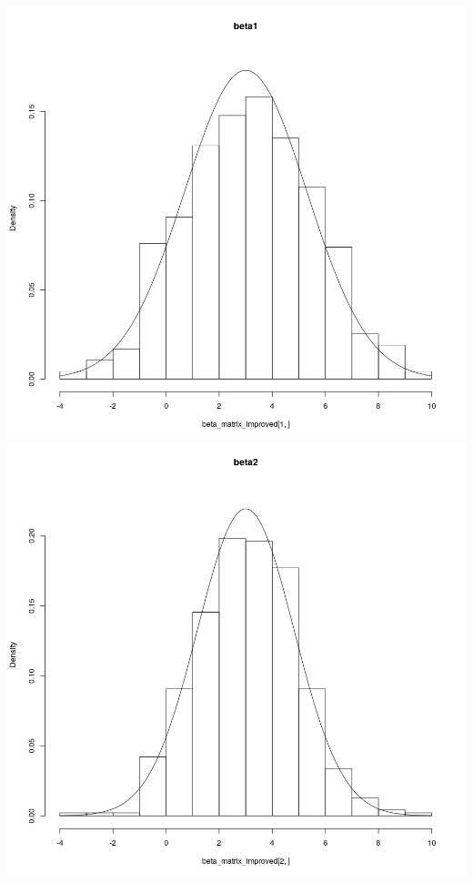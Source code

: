 \documentclass[a4paper,11pt]{article}
\begin{document}
\includegraphics[scale=.35]{e1.png} 
\includegraphics[scale=.35]{e2.png} 
\end{document}
